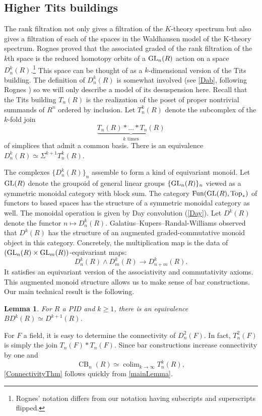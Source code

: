 \documentclass[a4paper]{amsart}
\DeclareMathOperator{\CB}{CB}
\DeclareMathOperator{\Top}{Top}
\DeclareMathOperator{\Fun}{Fun}
\newcommand{\m}{\to}
\numberwithin{theoremcounter}{section}
\newtheorem{lemma}[lemmaauto]{Lemma}
\theoremstyle{definition}
\theoremstyle{remark}
\newcommand{\mr}[1]{{\rm #1}}
\DeclareMathOperator*{\colim}{colim}
\newcommand{\GL}{\mr{GL}}
\begin{document}
\subsection{Higher Tits buildings} 

The rank filtration not only gives a filtration of the $K$-theory spectrum but also gives a filtration of each of the spaces in the Waldhausen model of the K-theory  spectrum. Rognes proved that the associated graded of the rank filtration of the $k$th space is the reduced homotopy orbits of a $\GL_n(R)$ action on a space $D^k_n(R)$.\footnote{Rognes' notation differs from our notation having subscripts and superscripts flipped.} This space can be thought of as a $k$-dimensional version of the Tits building. The definition of $D^k_n(R)$ is somewhat involved (see \autoref{Dab}, following Rognes \cite[Definition 3.9]{Rog1}) so we will only describe a model of its desuspension here. Recall that the Tits building $T_n(R)$ is the realization of the poset of proper nontrivial summands of $R^n$ ordered by inclusion. Let $T^k_n(R)$ denote the subcomplex of the $k$-fold join \[\underbrace{T_n(R) * \dots * T_n(R)}_{k \text{ times}} \] of simplices that admit a common basis.  There is an equivalence $D_n^k(R) \simeq \Sigma^{k+1} T_n^k(R)$. 

The complexes $\{D^k_n(R)\}_n$ assemble to form a kind of equivariant monoid. Let $\GL(R)$ denote the groupoid of general linear groups $\{\GL_n(R)\}_n$ viewed as a symmetric monoidal category with block sum. 
The category $\Fun(\GL(R),{\Top_*}  )$ of functors to based spaces has  the structure of a symmetric monoidal category as well. The monoidal operation is given by Day convolution (\autoref{Day}). 
 Let $D^k(R)$ denote the functor $n \mapsto D^k_n(R)$. Galatius--Kupers--Randal-Williams \cite{e2cellsIV} observed that  $D^k(R)$ has the structure of an augmented graded-commutative monoid object in this category. Concretely, the multiplication map is the data of $(\GL_n(R) \times \GL_m(R))$-equivariant maps: \[D^k_n(R) \wedge D^k_m(R) \m D^k_{n+m}(R). \] It satisfies an equivariant version of the associativity and commutativity axioms. This augmented monoid structure allows us to make sense of bar constructions. Our main technical result is the following. 

\begin{lemma} \label{mainLemma} For $R$ a PID and $k \geq 1$, there is an equivalence $B D^k(R) \simeq D^{k+1}(R)$.
\end{lemma}

For $F$ a field, it is easy to determine the connectivity of $D^2_n(F)$. In fact, $T_n^2(F)$ is simply the join $T_n(F) * T_n(F)$. Since bar constructions increase connectivity by one and \[{\CB}_n(R) \simeq \colim_{k \m \infty} T_n^k(R),\] \autoref{ConnectivityThm} follows quickly from \autoref{mainLemma}.
\end{document}
